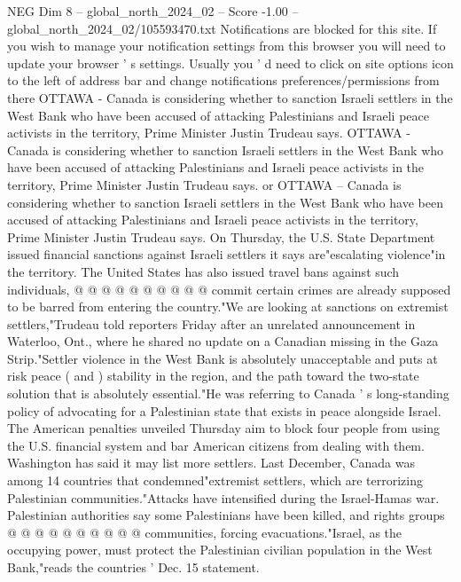 \begin{textsample}{NEG Dim 8 – global\_north\_2024\_02 – Score -1.00 – global\_north\_2024\_02/105593470.txt}  \label{ex:f8_neg_435}
Notifications are blocked for this site.
If you wish to manage your notification settings from this browser you will need to update your browser ' s settings.
Usually you ' d need to click on site options icon to the left of address bar and change notifications preferences/permissions from there OTTAWA - Canada is considering whether to sanction Israeli settlers in the West Bank who have been accused of attacking Palestinians and Israeli peace activists in the territory, Prime Minister Justin Trudeau says.
OTTAWA - Canada is considering whether to sanction Israeli settlers in the West Bank who have been accused of attacking Palestinians and Israeli peace activists in the territory, Prime Minister Justin Trudeau says. or OTTAWA -- Canada is considering whether to sanction Israeli settlers in the West Bank who have been accused of attacking Palestinians and Israeli peace activists in the territory, Prime Minister Justin Trudeau says.
On Thursday, the U.S.
State Department issued financial sanctions against Israeli settlers it says are"escalating violence"in the territory.
The United States has also issued travel bans against such individuals, @ @ @ @ @ @ @ @ @ @ commit certain crimes are already supposed to be barred from entering the country."We are looking at sanctions on extremist settlers,"Trudeau told reporters Friday after an unrelated announcement in Waterloo, Ont., where he shared no update on a Canadian missing in the Gaza Strip."Settler violence in the West Bank is absolutely unacceptable and puts at risk peace ( and ) stability in the region, and the path toward the two-state solution that is absolutely essential."He was referring to Canada ' s long-standing policy of advocating for a Palestinian state that exists in peace alongside Israel.
The American penalties unveiled Thursday aim to block four people from using the U.S. financial system and bar American citizens from dealing with them.
Washington has said it may list more settlers.
Last December, Canada was among 14 countries that condemned"extremist settlers, which are terrorizing Palestinian communities."Attacks have intensified during the Israel-Hamas war.
Palestinian authorities say some Palestinians have been killed, and rights groups @ @ @ @ @ @ @ @ @ @ communities, forcing evacuations."Israel, as the occupying power, must protect the Palestinian civilian population in the West Bank,"reads the countries ' Dec. 15 statement.

\end{textsample}
